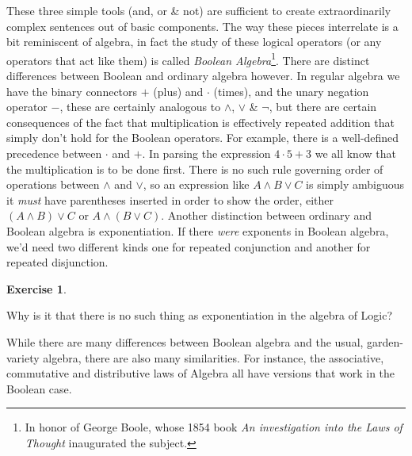 \documentclass[10pt,]{book}
\theoremstyle{plain}
\theoremstyle{definition}
\theoremstyle{definition}
\newtheorem{exercise}[theorem]{Exercise}
\numberwithin{equation}{section}
\begin{document}
    These three simple tools (and, or \& not) are sufficient to
    create extraordinarily complex sentences out of basic components.
    The way these pieces interrelate is a bit reminiscent of algebra,
    in fact the study of these logical operators (or any
    operators that act like them) is called 
    \emph{Boolean Algebra}\footnote{In honor of George Boole, whose 1854 
     book \emph{An investigation into the Laws of Thought} inaugurated the 
     subject.\label{fn-13}}. There are distinct differences
    between Boolean and ordinary algebra however. In regular algebra we have
    the binary connectors \(+\) (plus) and \(\cdot\) (times), and the unary
    negation operator \(-\), these are certainly analogous to \(\land\), \(\lor\) \&
    \(\lnot\), but there are certain consequences of the fact that multiplication
    is effectively repeated addition that simply don't hold for the Boolean
    operators. For example, there is a well-defined precedence between \(\cdot\) and
    \(+\). In parsing the expression \(4 \cdot 5 + 3\) we all know that the
    multiplication is to be done first. There is no such rule governing
    order of operations between \(\land\) and \(\lor\), so an expression like
    \(A \land B \lor C\) is simply ambiguous \textemdash{} it \emph{must} have parentheses
    inserted in order to show the order, either \((A \land B) \lor C\) or
    \(A \land (B \lor C)\). Another distinction between ordinary and Boolean
    algebra is exponentiation. If there \emph{were} exponents in Boolean algebra,
    we'd need two different kinds \textemdash{} one for repeated conjunction and another
    for repeated disjunction.
\begin{exercise}\label{exercise-7}

        Why is it that there is no such thing as exponentiation
        in the algebra of Logic?
\end{exercise}
\par

    While there are many differences between Boolean algebra and the
    usual, garden-variety algebra, there are also many similarities.
    For instance, the associative,
    commutative and
    distributive laws
    of Algebra all have versions that work in the Boolean case.
\par
\end{document}
